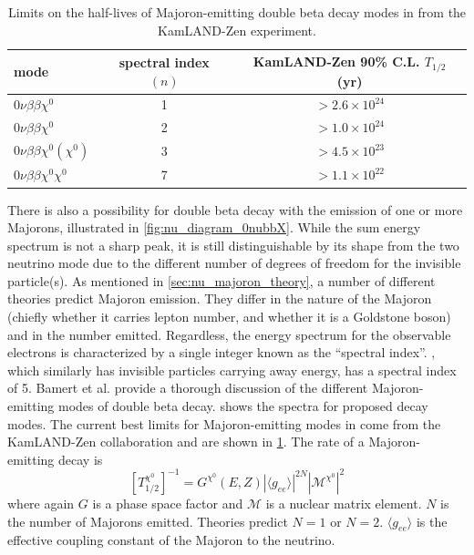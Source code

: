 \documentclass[herrin-thesis.tex]{subfiles}
\begin{document}
\begin{table}[tbp]
\centering
\caption[Current \(0\nu\beta\beta\chi^{0}(\chi^{0})\) limits]{Limits on the half-lives of Majoron-emitting double beta decay modes in  from the KamLAND-Zen experiment\cite{Gando:2012fk}.}
\label{tab:nu_majoron_limits}
\begin{tabular}{l c c}\toprule
	mode						&	spectral index \((n)\)		&	KamLAND-Zen 90\% C.L. \(T_{1/2}\) (yr)		\\\midrule
	\(0\nu\beta\beta\chi^{0}\)			&	1					&	\(>2.6\times10^{24}\)						\\
	\(0\nu\beta\beta\chi^{0}\)			&	2					&	\(>1.0\times10^{24}\)						\\
	\(0\nu\beta\beta\chi^{0}(\chi^{0})\)	&	3					&	\(>4.5\times10^{23}\)						\\
	\(0\nu\beta\beta\chi^{0}\chi^{0}\)	&	7					&	\(>1.1\times10^{22}\)						\\\bottomrule
\end{tabular}
\end{table}

There is also a possibility for double beta decay with the emission of one or more Majorons, illustrated in \cref{fig:nu_diagram_0nubbX}. While the sum energy spectrum is not a sharp peak, it is still distinguishable by its shape from the two neutrino mode due to the different number of degrees of freedom for the invisible particle(s). As mentioned in \cref{sec:nu_majoron_theory}, a number of different theories predict Majoron emission. They differ in the nature of the Majoron (chiefly whether it carries lepton number, and whether it is a Goldstone boson) and in the number emitted. Regardless, the energy spectrum for the observable electrons is characterized by a single integer known as the ``spectral index''. \twonu{}, which similarly has invisible particles carrying away energy, has a spectral index of 5. Bamert et al.\cite{Bamert:1995fk} provide a thorough discussion of the different Majoron-emitting modes of double beta decay.  shows the spectra for proposed decay modes. The current best limits for Majoron-emitting modes in  come from the KamLAND-Zen collaboration\cite{Gando:2012fk} and are shown in \cref{tab:nu_majoron_limits}. The rate of a Majoron-emitting decay is
\begin{equation}
\left [ T^{\chi^0}_{1/2} \right ]^{-1} = G^{\chi^{0}}\left(E, Z\right)\left | \langle g_{e e} \rangle \right |^{2N}\left | \mathcal{M}^{\chi^{0}}\right |^2
\label{eq:nu_majoron_rate}
\end{equation}
where again \(G\) is a phase space factor and \(\mathcal{M}\) is a nuclear matrix element. \(N\) is the number of Majorons emitted. Theories predict \(N=1\) or \(N=2\). \(\langle g_{e e} \rangle\) is the effective coupling constant of the Majoron to the neutrino.
\end{document}
